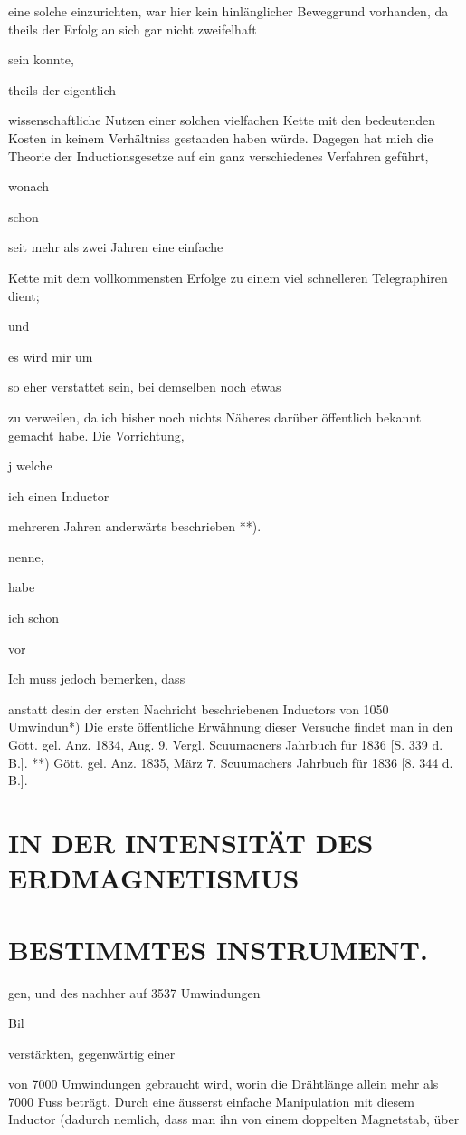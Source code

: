 \documentclass[12pt,a4paper]{article}
\begin{document}
eine solche einzurichten, war hier kein hinlänglicher Beweggrund vorhanden, da theils der Erfolg an sich gar nicht zweifelhaft

sein konnte,

theils der eigentlich

wissenschaftliche Nutzen einer solchen vielfachen Kette mit den bedeutenden Kosten in keinem Verhältniss gestanden haben würde. Dagegen hat mich die Theorie der Inductionsgesetze auf ein ganz verschiedenes Verfahren geführt,

wonach

schon

seit mehr als zwei Jahren eine einfache

Kette mit dem vollkommensten Erfolge zu einem viel schnelleren Telegraphiren dient;

und

es wird mir um

so eher verstattet sein, bei demselben noch etwas

zu verweilen, da ich bisher noch nichts Näheres darüber öffentlich bekannt gemacht habe. Die Vorrichtung,

j welche

ich einen Inductor

mehreren Jahren anderwärts beschrieben **).

nenne,

habe

ich schon

vor

Ich muss jedoch bemerken, dass

anstatt desin der ersten Nachricht beschriebenen Inductors von 1050 Umwindun*) Die erste öffentliche Erwähnung dieser Versuche findet man in den Gött. gel. Anz. 1834, Aug. 9. Vergl. Scuumacners Jahrbuch für 1836 [S. 339 d. B.]. **) Gött. gel. Anz. 1835, März 7. Scuumachers Jahrbuch für 1836 [8. 344 d. B.].

\section*{IN DER INTENSITÄT DES ERDMAGNETISMUS}
\section*{BESTIMMTES INSTRUMENT.}
gen, und des nachher auf 3537 Umwindungen

Bil

verstärkten, gegenwärtig einer

von 7000 Umwindungen gebraucht wird, worin die Drähtlänge allein mehr als 7000 Fuss beträgt. Durch eine äusserst einfache Manipulation mit diesem Inductor (dadurch nemlich, dass man ihn von einem doppelten Magnetstab, über
\end{document}
